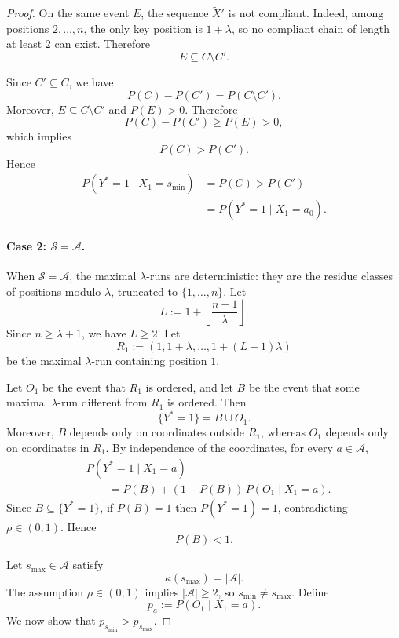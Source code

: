 \documentclass[fullpaper]{nldl}
\theoremstyle{plain}
\theoremstyle{definition}
\theoremstyle{remark}
\begin{document}
\begin{proof}
On the same event $E$, the sequence $\widetilde X'$ is not compliant.
Indeed, among positions $2,\ldots,n$, the only key position is $1+\lambda$,
so no compliant chain of length at least $2$ can exist. Therefore
\[
E \subseteq C\setminus C'.
\]

Since \(C' \subseteq C\), we have
\[
P(C)-P(C') = P(C\setminus C').
\]
Moreover, \(E \subseteq C\setminus C'\) and \(P(E)>0\). Therefore
\[
P(C)-P(C') \ge P(E) > 0,
\]
which implies
\[
P(C) > P(C').
\]
Hence
\[
\begin{aligned}
P(Y^*=1 \mid X_1=s_{\min})
&=
P(C)
>
P(C')\\
&=
P(Y^*=1 \mid X_1=a_0).
\end{aligned}
\]

\paragraph{Case 2: $\mathcal{S}=\mathcal{A}$.}
When $\mathcal{S}=\mathcal{A}$, the maximal $\lambda$-runs are deterministic:
they are the residue classes of positions modulo $\lambda$, truncated to
$\{1,\ldots,n\}$. Let
\[
L := 1+\left\lfloor \frac{n-1}{\lambda}\right\rfloor .
\]
Since $n\geq \lambda+1$, we have $L\geq 2$. Let
\[
R_1 := (1,1+\lambda,\ldots,1+(L-1)\lambda)
\]
be the maximal $\lambda$-run containing position $1$.

Let $O_1$ be the event that $R_1$ is ordered, and let $B$ be the event that
some maximal $\lambda$-run different from $R_1$ is ordered. Then
\[
\{Y^*=1\}=B\cup O_1.
\]
Moreover, $B$ depends only on coordinates outside $R_1$, whereas $O_1$
depends only on coordinates in $R_1$. By independence of the coordinates,
for every $a\in\mathcal{A}$,
\[
\begin{aligned}
&P(Y^*=1\mid X_1=a)\\
&\qquad=
P(B)+(1-P(B))\,P(O_1\mid X_1=a).
\end{aligned}
\]
Since $B\subseteq\{Y^*=1\}$, if $P(B)=1$ then $P(Y^*=1)=1$, contradicting
$\rho\in(0,1)$. Hence
\[
P(B)<1.
\]

Let $s_{\max}\in\mathcal{A}$ satisfy
\[
\kappa(s_{\max})=|\mathcal{A}|.
\]
The assumption $\rho\in(0,1)$ implies $|\mathcal{A}|\geq 2$, so
$s_{\min}\neq s_{\max}$. Define
\[
p_a := P(O_1\mid X_1=a).
\]
We now show that $p_{s_{\min}}>p_{s_{\max}}$.


\end{proof}
\end{document}
